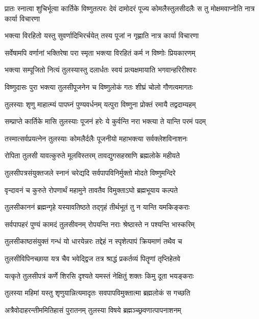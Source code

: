 \threelineshloka
{प्रातः स्नात्वा शुचिर्भूत्वा कार्तिके विष्णुतत्परः}
{देवं दामोदरं पूज्य कोमलैस्तुलसीदलैः}
{स तु मोक्षमवाप्नोति नात्र कार्या विचारणा} %

\twolineshloka
{भक्त्या विरहितो यस्तु सुवर्णादिभिरर्चयेत्}
{तस्य पूजां न गृह्णाति नात्र कार्या विचारणा} %

\twolineshloka
{सर्वेषामपि वर्णानां भक्तिरेषा परा स्मृता}
{भक्त्या विरहितं कर्म न विष्णोः प्रियकारणम्} %

\twolineshloka
{भक्त्या सम्पूजितो नित्यं तुलस्यास्तु दलार्धतः}
{स्वयं प्रत्यक्षमायाति भगवान्हरिरीश्वरः} %

\twolineshloka
{विष्णुदासः पुरा भक्त्या तुलसीपूजनेन च}
{विष्णुलोकं गतः शीघ्रं चोलो गौणत्वमागतः} %

\twolineshloka
{तुलस्याः शृणु माहात्म्यं पापघ्नं पुण्यवर्धनम्}
{यत्पुरा विष्णुना प्रोक्तं रमायै तद्वदाम्यहम्} %

\twolineshloka
{सम्प्राप्ते कार्तिके मासि तुलस्याः पूजनं हरेः}
{ये कुर्वन्ति नरा भक्त्या ते यान्ति परमं पदम्} %

\twolineshloka
{तस्मात्सर्वप्रयत्नेन तुलस्याः कोमलैर्दलैः}
{पूजनीयो महाभक्त्या सर्वक्लेशविनाशनः} %

\twolineshloka
{रोपिता तुलसी यावत्कुरुते मूलविस्तरम्}
{तावद्युगसहस्राणि ब्रह्मलोके महीयते} %

\twolineshloka
{तुलसीपत्रसंयुक्तजले स्नानं चरेद्यदि}
{सर्वपापविनिर्मुक्तो मोदते विष्णुमन्दिरे} %

\twolineshloka
{वृन्दावनं च कुरुते रोपणार्थं महामुने}
{तावतैव विमुक्ताऽघो ब्रह्मभूयाय कल्पते} %

\twolineshloka
{तुलसीकाननं ब्रह्मन्गृहे यस्यावतिष्ठते}
{तद्गृहं तीर्थभूतं तु न यान्ति यमकिङ्कराः} %

\twolineshloka
{सर्वपापहरं पुण्यं कामदं तुलसीवनम्}
{रोपयन्ति नराः श्रेष्ठास्ते न पश्यन्ति भास्करिम्} %

\twolineshloka
{तुलसीकाष्ठसंयुक्तं गन्धं यो धारयेन्नरः}
{तद्देहं न स्पृशेत्पापं क्रियमाणं तथैव च} %

\twolineshloka
{तुलसीविपिनच्छाया यत्र चैव भवेद्द्विज}
{तत्र श्राद्धं प्रकर्तव्यं पितॄणां तृप्तिहेतवे} %

\twolineshloka
{यत्कृते तुलसीपत्रं कर्णे शिरसि दृश्यते}
{यमस्तं नेक्षितुं शक्तः किमु दूता भयङ्कराः} %

\twolineshloka
{तुलस्या महिमां यस्तु शृणुयान्नित्यमादृतः}
{सवपापविमुक्तात्मा ब्रह्मलोकं स गच्छति} %

\twolineshloka
{अत्रैवोदाहरन्तीममितिहासं पुरातनम्}
{तुलस्या विषये ब्रह्मञ्च्छ्रवणात्पापनाशनम्} %

